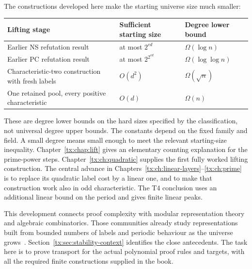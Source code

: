 The constructions developed here make the starting universe size much smaller:
\begin{center}
\begin{tabular}{@{}>{\raggedright\arraybackslash}p{.43\linewidth}>{\raggedright\arraybackslash}p{.25\linewidth}>{\raggedright\arraybackslash}p{.22\linewidth}@{}}
\toprule
Lifting stage & Sufficient starting size & Degree lower bound\\
\midrule
Earlier NS refutation result & at most $2^{cd}$ & $\Omega(\log n)$\\
Earlier PC refutation result & at most $2^{2^{cd}}$ & $\Omega(\log\log n)$\\
Characteristic-two construction with fresh labels & $O(d^2)$ & $\Omega(\sqrt n)$\\
One retained pool, every positive characteristic & $O(d)$ & $\Omega(n)$\\
\bottomrule
\end{tabular}
\end{center}
These are degree lower bounds on the hard sizes specified by the
classification, not universal degree upper bounds.
The constants depend on the fixed family and field. A small degree
means small enough to meet the relevant starting-size inequality.
Chapter~\ref{tx:chap:lift} gives an elementary counting explanation
for the prime-power steps. Chapter~\ref{tx:ch:quadratic} supplies the
first fully worked lifting construction. The central
advance in Chapters~\ref{tx:ch:linear-layers}--\ref{tx:ch:prime} is to
replace its quadratic label cost by a linear one, and to make that
construction work also in odd characteristic. The T4 conclusion uses
an additional linear bound on the period and gives finite linear peaks.

This development connects proof complexity with modular representation
theory and algebraic combinatorics. Those communities already study
representations built from bounded numbers of labels and periodic
behaviour as the universe grows~\cite{CEF,Harman,HKPSYZ,BDM}.
Section~\ref{tx:sec:stability-context} identifies the close antecedents.
The task here is to prove transport for the actual polynomial proof
rules and targets, with all the required finite constructions supplied
in the book.

